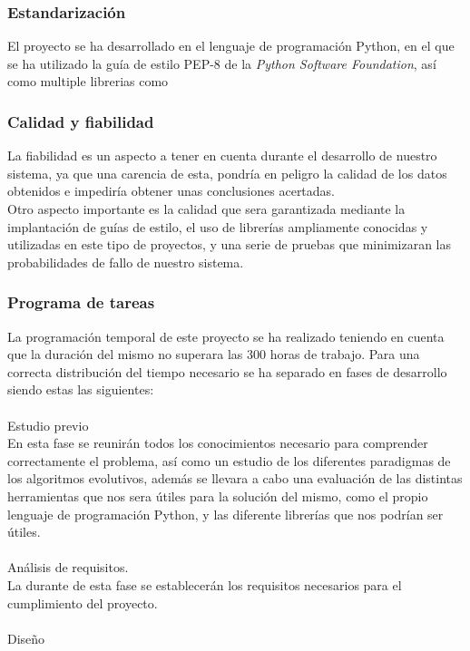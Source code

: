 \documentclass[a4paper,12pt,twoside,final]{book}
\begin{document}
\subsubsection{Estandarización}
El proyecto se ha desarrollado en el lenguaje de programación Python, en el que se ha utilizado la guía de estilo PEP-8 \cite{} de la \textit{Python Software Foundation}, así como multiple librerias como 
\subsubsection{Calidad y fiabilidad}
La fiabilidad es un aspecto a tener en cuenta durante el desarrollo de nuestro sistema, ya que una carencia de esta, pondría en peligro la calidad de los datos obtenidos e impediría obtener unas conclusiones acertadas.\\

Otro aspecto importante es la calidad que sera garantizada mediante la implantación de guías de estilo, el uso de librerías ampliamente conocidas y utilizadas en este tipo de proyectos, y una serie de pruebas que minimizaran las probabilidades de fallo de nuestro sistema.


\subsubsection{Programa de tareas}
La programación temporal de este proyecto se ha realizado teniendo en cuenta que la duración del mismo no superara las 300 horas de trabajo. Para una correcta distribución del tiempo necesario se ha separado en fases de desarrollo siendo estas las siguientes:\\
\\
Estudio previo\\

En esta fase se reunirán todos los conocimientos necesario para comprender correctamente el problema, así como un estudio de los diferentes paradigmas de los algoritmos evolutivos, además se llevara a cabo una evaluación de las distintas herramientas que nos sera útiles para la solución del mismo, como el propio lenguaje de programación Python, y las diferente librerías que nos podrían ser útiles.\\
\\
Análisis de requisitos.\\

La durante de esta fase se establecerán los requisitos necesarios para el cumplimiento del proyecto.\\
\\
Diseño\\
\end{document}

